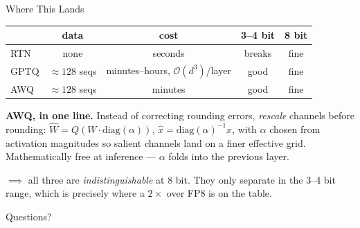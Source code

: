 \documentclass[aspectratio=169, 11pt]{beamer}
\begin{document}
\begin{frame}{Where This Lands}
  \begin{table}
  \centering
  \small
  \begin{tabular}{lcccc}
  \toprule
  & \textbf{data} & \textbf{cost} & \textbf{3--4 bit} & \textbf{8 bit} \\
  \midrule
  RTN   & none                & seconds                     & breaks       & fine \\
  GPTQ  & $\approx 128$ seqs  & minutes--hours, $\mathcal{O}(d^3)$/layer & good & fine \\
  AWQ   & $\approx 128$ seqs  & minutes                     & good         & fine \\
  \bottomrule
  \end{tabular}
  \end{table}

  \textbf{AWQ, in one line.} Instead of correcting rounding errors, \emph{rescale} channels before
  rounding: $\hat{W} = Q(W \cdot \mathrm{diag}(\alpha))$, $\hat{x} = \mathrm{diag}(\alpha)^{-1} x$,
  with $\alpha$ chosen from activation magnitudes so salient channels land on a finer effective grid.
  Mathematically free at inference --- $\alpha$ folds into the previous layer.

  \vspace{0.3em}
  $\implies$ all three are \emph{indistinguishable} at 8 bit. They only separate in the 3--4 bit range,
  which is precisely where a $2\times$ over FP8 is on the table.
\end{frame}

%   

\appendix

\begin{frame}[standout]
  Questions?
\end{frame}
\end{document}
